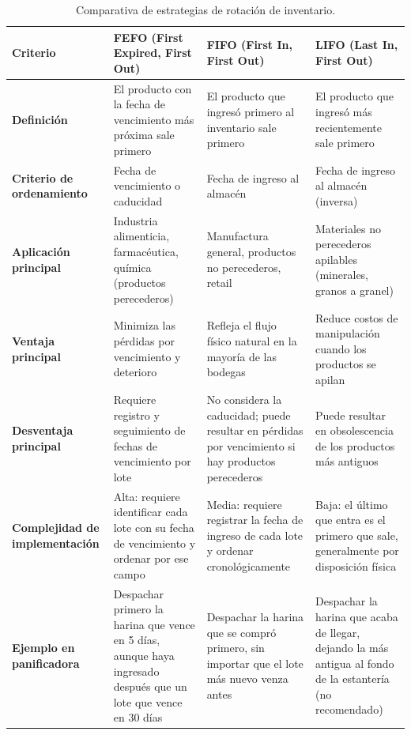 \begin{table}[!htbp]
\centering
\caption{Comparativa de estrategias de rotación de inventario.}
\label{tab:comparativa_rotacion}
\begin{tabular}{|p{2.5cm}|p{3.5cm}|p{3.5cm}|p{3.5cm}|}
\hline
\textbf{Criterio} & \textbf{FEFO (First Expired, First Out)} & \textbf{FIFO (First In, First Out)} & \textbf{LIFO (Last In, First Out)} \\
\hline
\textbf{Definición} & El producto con la fecha de vencimiento más próxima sale primero & El producto que ingresó primero al inventario sale primero & El producto que ingresó más recientemente sale primero \\
\hline
\textbf{Criterio de ordenamiento} & Fecha de vencimiento o caducidad & Fecha de ingreso al almacén & Fecha de ingreso al almacén (inversa) \\
\hline
\textbf{Aplicación principal} & Industria alimenticia, farmacéutica, química (productos perecederos) & Manufactura general, productos no perecederos, retail & Materiales no perecederos apilables (minerales, granos a granel) \\
\hline
\textbf{Ventaja principal} & Minimiza las pérdidas por vencimiento y deterioro & Refleja el flujo físico natural en la mayoría de las bodegas & Reduce costos de manipulación cuando los productos se apilan \\
\hline
\textbf{Desventaja principal} & Requiere registro y seguimiento de fechas de vencimiento por lote & No considera la caducidad; puede resultar en pérdidas por vencimiento si hay productos perecederos & Puede resultar en obsolescencia de los productos más antiguos \\
\hline
\textbf{Complejidad de implementación} & Alta: requiere identificar cada lote con su fecha de vencimiento y ordenar por ese campo & Media: requiere registrar la fecha de ingreso de cada lote y ordenar cronológicamente & Baja: el último que entra es el primero que sale, generalmente por disposición física \\
\hline
\textbf{Ejemplo en panificadora} & Despachar primero la harina que vence en 5 días, aunque haya ingresado después que un lote que vence en 30 días & Despachar la harina que se compró primero, sin importar que el lote más nuevo venza antes & Despachar la harina que acaba de llegar, dejando la más antigua al fondo de la estantería (no recomendado) \\
\hline
\end{tabular}
\end{table}

